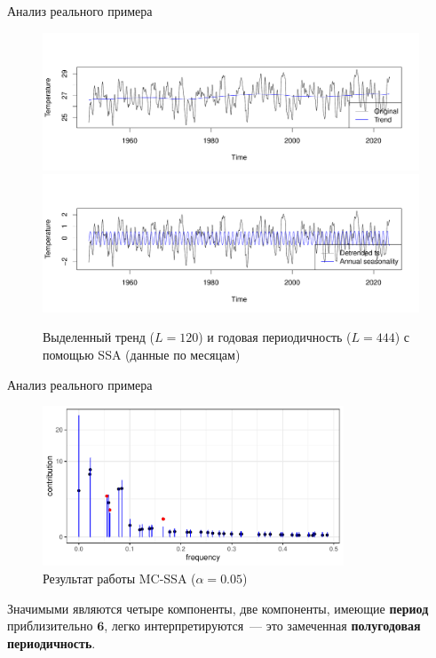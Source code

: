 \documentclass[pdf,notheorems,10pt,intlimits, unicode]{beamer}
\begin{document}
\begin{frame}{Анализ реального примера}
  \begin{figure}
    \centering
    \includegraphics[width=\textwidth]{img/Nino_reconstruct_trend_slides.pdf}\vspace{-2.8em}
    \includegraphics[width=\textwidth]{img/Nino_reconstruct_season_slides.pdf}\vspace{-1em}
    \caption{Выделенный тренд ($L=120$) и годовая периодичность ($L=444$) с помощью SSA (данные по месяцам)}
  \end{figure}
\end{frame}

\begin{frame}{Анализ реального примера}
  \begin{figure}[h!]
    \centering
    \includegraphics[width=0.8\textwidth]{img/Nino_mcssa.pdf}
    \caption{Результат работы MC-SSA ($\alpha=0.05$)}
    \label{Nino_mcssa}
  \end{figure}
  Значимыми являются четыре компоненты, две компоненты, имеющие \textbf{период} приблизительно $\mathbf{6}$, легко интерпретируются~---  это замеченная \textbf{полугодовая периодичность}.
\end{frame}
\end{document}
